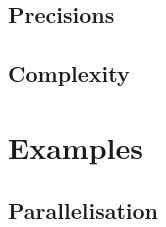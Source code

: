\documentclass[a4paper,11pt]{article}
\numberwithin{equation}{section}
\theoremstyle{definition}
\begin{document}
\subsection{Precisions}

\subsection{Complexity}


\section{Examples}
\label{sec:Examples}

\subsection{Parallelisation}
\end{document}
